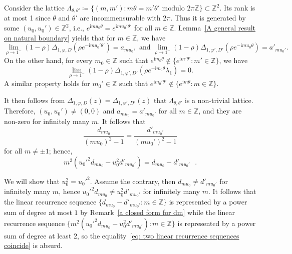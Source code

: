 \documentclass[11pt,a4paper]{article}
\theoremstyle{plain}
\theoremstyle{remark}
\theoremstyle{custombold}
\newcommand{\irm}{\mathrm{i}}
\begin{document}
Consider the lattice $\Lambda_{\theta,\theta'}\coloneqq \{(m,m'):m\theta= m'\theta'\text{ modulo }2\pi\mathbb Z\}\subset\mathbb Z^2$. Its rank is at most 1 since $\theta$ and $\theta'$ are incommensurable with $2\pi$. Thus it is generated by some $(u_0,u_0')\in\mathbb Z^2$, i.e., $e^{\irm mu_0\theta}=e^{\irm mu_0'\theta'}$ for all $m\in\mathbb Z$. Lemma~\ref{A general result on natural boundary} yields that for $m\in\mathbb Z$, we have
\begin{equation*}\label{eq: singularities of Delta varphi}
  \lim_{\rho\to 1^{-}}(1-\rho)\Delta_{1,\varphi,D}(\rho e^{-\irm mu_0'\theta'})=a_{mu_0}, \text{ and } \lim_{\rho\to 1^{-}}(1-\rho)\Delta_{1,\varphi',D'}(\rho e^{-\irm mu_0\theta}) =a'_{mu_0'}.
\end{equation*}
On the other hand, for every $m_0\in\mathbb Z$ such that $e^{\irm m_0\theta}\not\in\{e^{\irm m'\theta'}:m'\in\mathbb Z\}$, we have
\begin{equation*}\label{eq: vanishing points of (1-rho)Delta varphi'}
\lim_{\rho\to1^{-}}(1-\rho)\Delta_{1,\varphi',D'}(\rho e^{-\irm m_0\theta}\lambda_1)=0.   
\end{equation*}
A similar property holds for $m_0'\in\mathbb Z$ such that $e^{\irm m_0'\theta'}\not\in\{e^{\irm m\theta}:m\in\mathbb Z\}$. 

It then follows from  $\Delta_{1,\varphi,D}(z)=\Delta_{1,\varphi',D'}(z)$ that $\Lambda_{\theta,\theta'}$ is a non-trivial lattice. Therefore, $(u_0,u_0')\neq(0,0)$ and $a_{mu_0}=a'_{mu_0'}$ for all $m\in\mathbb Z$, and they are non-zero for infinitely many $m$.
 It follows that 
 \[\frac{d_{mu_0}}{(mu_0)^2-1}=\frac{d'_{mu_0'}}{(mu_0')^2-1}\] for all $m\neq\pm1$; hence,
 \begin{equation}\label{eq: two linear recurrence sequences coincide}
     m^2(u_0'^2d_{mu_0}-u_0^2d'_{mu_0'})=d_{mu_0}-d'_{mu_0'}\text{ }.
 \end{equation}
 
We will show that $u_0^2=u_0'^2$. Assume the contrary, then $d_{mu_0}\neq d'_{mu_0'}$ for infinitely many $m$, hence $u_0'^2d_{mu_0}\neq u_0^2d'_{mu_0'}$ for infinitely many $m$. It follows that the linear recurrence sequence $\{d_{mu_0}-d'_{mu_0'}:m\in\mathbb Z\}$ is represented by a power sum of degree at most $1$ by Remark~\ref{a closed form for dm} while the linear recurrence sequence
$\{m^2(u_0'^2d_{mu_0}-u_0^2d'_{mu_0'}):m\in\mathbb Z\}$ is represented by a power sum of degree at least $2$, so the equality~\eqref{eq: two linear recurrence sequences coincide} is absurd.
\end{document}
